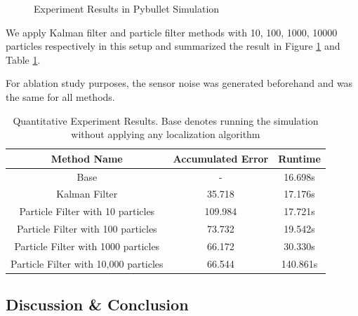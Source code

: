 \documentclass[conference,onecolumn]{IEEEtran}
\begin{document}
\begin{figure}[H]
\caption{Experiment Results in Pybullet Simulation}
\label{fig: result}
\end{figure}

We apply Kalman filter and particle filter methods with 10, 100, 1000, 10000 particles respectively in this setup and summarized the result in Figure \ref{fig: result} and Table \ref{tab: stat}.

For ablation study purposes, the sensor noise was generated beforehand and was the same for all methods.

 \begin{table}[H] 
 \centering 
 \begin{tabular}{c|c|c} 
  Method Name & Accumulated Error & Runtime\\ \hline
  Base & - & 16.698s \\
  Kalman Filter &  35.718 &17.176s\\
  Particle Filter with 10 particles& 109.984  &17.721s\\
  Particle Filter with 100 particles&  73.732 &19.542s\\
  Particle Filter with 1000 particles& 66.172 &30.330s\\
  Particle Filter with 10,000 particles&  66.544 &140.861s\\
 \end{tabular}%
 \caption{Quantitative Experiment Results. Base denotes running the simulation without applying any localization algorithm} 
 \label{tab: stat}%
 \end{table}%

\subsection{Discussion \& Conclusion}
\end{document}
